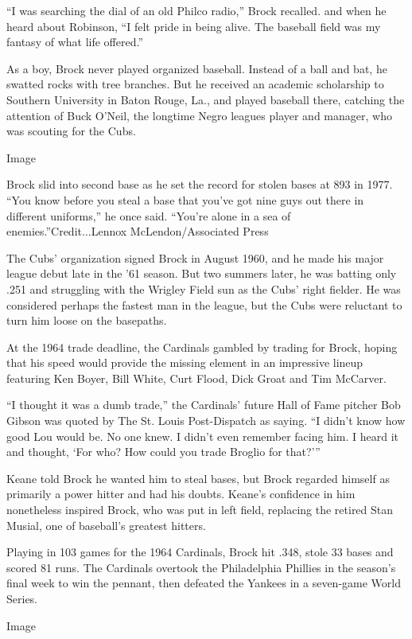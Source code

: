 ``I was searching the dial of an old Philco radio,'' Brock recalled. and
when he heard about Robinson, ``I felt pride in being alive. The
baseball field was my fantasy of what life offered.''

As a boy, Brock never played organized baseball. Instead of a ball and
bat, he swatted rocks with tree branches. But he received an academic
scholarship to Southern University in Baton Rouge, La., and played
baseball there, catching the attention of Buck O'Neil, the longtime
Negro leagues player and manager, who was scouting for the Cubs.

Image

Brock slid into second base as he set the record for stolen bases at 893
in 1977. ``You know before you steal a base that you've got nine guys
out there in different uniforms,'' he once said. ``You're alone in a sea
of enemies.''Credit...Lennox McLendon/Associated Press

The Cubs' organization signed Brock in August 1960, and he made his
major league debut late in the '61 season. But two summers later, he was
batting only .251 and struggling with the Wrigley Field sun as the Cubs'
right fielder. He was considered perhaps the fastest man in the league,
but the Cubs were reluctant to turn him loose on the basepaths.

At the 1964 trade deadline, the Cardinals gambled by trading for Brock,
hoping that his speed would provide the missing element in an impressive
lineup featuring Ken Boyer, Bill White, Curt Flood, Dick Groat and Tim
McCarver.

``I thought it was a dumb trade,'' the Cardinals' future Hall of Fame
pitcher Bob Gibson was quoted by The St. Louis Post-Dispatch as saying.
``I didn't know how good Lou would be. No one knew. I didn't even
remember facing him. I heard it and thought, `For who? How could you
trade Broglio for that?'''

Keane told Brock he wanted him to steal bases, but Brock regarded
himself as primarily a power hitter and had his doubts. Keane's
confidence in him nonetheless inspired Brock, who was put in left field,
replacing the retired Stan Musial, one of baseball's greatest hitters.

Playing in 103 games for the 1964 Cardinals, Brock hit .348, stole 33
bases and scored 81 runs. The Cardinals overtook the Philadelphia
Phillies in the season's final week to win the pennant, then defeated
the Yankees in a seven-game World Series.

Image

